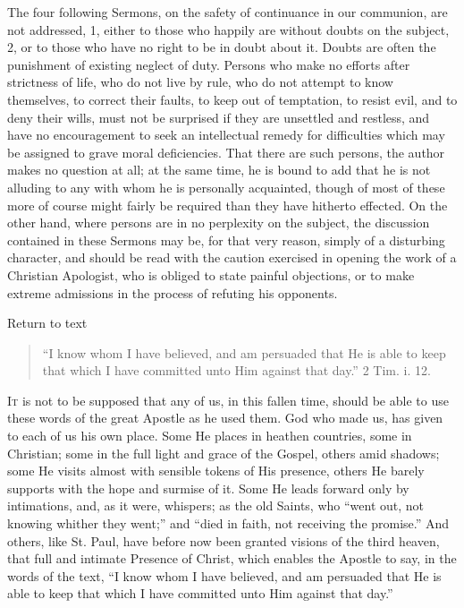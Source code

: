 
The four following Sermons, on the safety of continuance in our
communion, are not addressed, 1, either to those who happily are
without doubts on the subject, 2, or to those who have no right to be
in doubt about it. Doubts are often the punishment of existing neglect
of duty. Persons who make no efforts after strictness of life, who do
not live by rule, who do not attempt to know themselves, to correct
their faults, to keep out of temptation, to resist evil, and to deny
their wills, must not be surprised if they are unsettled and restless,
and have no encouragement to seek an intellectual remedy for
difficulties which may be assigned to grave moral deficiencies. That
there are such persons, the author makes no question at all; at the
same time, he is bound to add that he is not alluding to any with whom
he is personally acquainted, though of most of these more of course
might fairly be required than they have hitherto effected. On the
other hand, where persons are in no perplexity on the subject, the
discussion contained in these Sermons may be, for that very reason,
simply of a disturbing character, and should be read with the caution
exercised in opening the work of a Christian Apologist, who is obliged
to state painful objections, or to make extreme admissions in the
process of refuting his opponents.

Return to text


\begin{quote}

``I know whom I have believed, and am persuaded that He is
able to keep that which I have committed unto Him against that
day.'' 2 Tim. i. 12.

\end{quote}

I\textsc{t} is not to be supposed that any of us, in this fallen time,
should be able to use these words of the great Apostle as he used
them. God who made us, has given to each of us his own place. Some He
places in heathen countries, some in Christian; some in the full light
and grace of the Gospel, others amid shadows; some He visits almost
with sensible tokens of His presence, others He barely supports with
the hope and surmise of it. Some He leads forward only by intimations,
and, as it were, whispers; as the old Saints, who ``went out, not
knowing whither they went;'' and ``died in faith, not
receiving the promise.'' And others, like St. Paul, have before
now been granted visions of the third heaven, that full and intimate
Presence of Christ, which enables the Apostle to say, in the words of
the text, ``I know whom I have believed, and am persuaded that He
is able to keep that which I have committed unto Him against that
day.''

